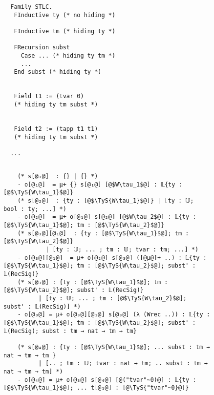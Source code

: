 \begin{figure}[!htb]
  
  \begin{minipage}{\textwidth}
  \begin{multicols}{3}
  

  
  \begin{lstlisting}
  Family STLC. 
   FInductive ty (* no hiding *)

   FInductive tm (* hiding ty *) 
   
   FRecursion subst
     Case ... (* hiding ty tm *)
     ...
   End subst (* hiding ty *) 
   

   Field t1 := (tvar 0) 
   (* hiding ty tm subst *) 


   Field t2 := (tapp t1 t1)
   (* hiding ty tm subst *)

  ...
  \end{lstlisting}
  
  
  \columnbreak
  
  \begin{lstlisting}

    (* s[@₁@]  : {} | {} *)
    - o[@₁@]  = μ+ {} s[@₁@] [@$W\tau_1$@] : 𝕃{ty : [@$\TyS{W\tau_1}$@]}
    (* s[@₂@]  : {ty : [@$\TyS{W\tau_1}$@]} | [ty : 𝕌; bool : ty; ...] *) 
    - o[@₂@]  = μ+ o[@₁@] s[@₂@] [@$W\tau_2$@] : 𝕃{ty : [@$\TyS{W\tau_1}$@]; tm : [@$\TyS{W\tau_2}$@]}
    (* s[@₃@][@₁@]  : {ty : [@$\TyS{W\tau_1}$@]; tm : [@$\TyS{W\tau_2}$@]}
            | [ty : 𝕌; ... ; tm : 𝕌; tvar : tm; ...] *)
    - o[@₃@][@₁@]  = μ+ o[@₂@] s[@₃@] ([@μ@]+ ..) : 𝕃{ty : [@$\TyS{W\tau_1}$@]; tm : [@$\TyS{W\tau_2}$@]; subst' : 𝕃(RecSig)}
    (* s[@₃@] : {ty : [@$\TyS{W\tau_1}$@]; tm : [@$\TyS{W\tau_2}$@]; subst' : 𝕃(RecSig)} 
          | [ty : 𝕌; ... ; tm : [@$\TyS{W\tau_2}$@]; subst' : 𝕃(RecSig)] *)
    - o[@₃@] = μ+ o[@₃@][@₁@] s[@₃@] (λ (Wrec ..)) : 𝕃{ty : [@$\TyS{W\tau_1}$@]; tm : [@$\TyS{W\tau_2}$@]; subst' : 𝕃(RecSig); subst : tm → nat → tm → tm}
    
    (* s[@₄@] : {ty : [@$\TyS{W\tau_1}$@]; ... subst : tm → nat → tm → tm } 
          | [.. ; tm : 𝕌; tvar : nat → tm; .. subst : tm → nat → tm → tm] *)
    - o[@₄@] = μ+ o[@₃@] s[@₄@] [@("tvar"~0)@] : 𝕃{ty : [@$\TyS{W\tau_1}$@]; ... t[@₁@] : [@\TyS{"tvar"~0}@]}
  

\end{lstlisting}
\end{multicols}
\end{minipage}
\end{figure}
